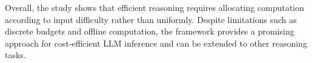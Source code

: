\documentclass[12pt,a4paper,titlepage]{report}
\begin{document}
Overall, the study shows that efficient reasoning requires allocating computation according to input difficulty rather than uniformly. Despite limitations such as discrete budgets and offline computation, the framework provides a promising approach for cost-efficient LLM inference and can be extended to other reasoning tasks.


%   

\clearpage
\end{document}
